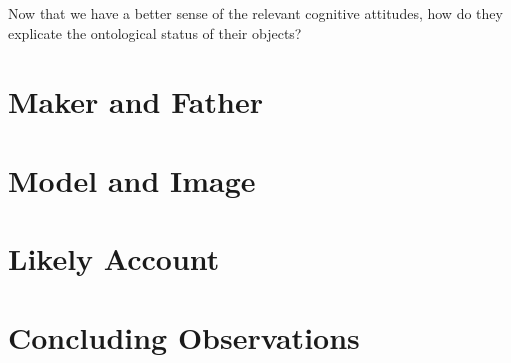 Now that we have a better sense of the relevant cognitive attitudes, how do they explicate the ontological status of their objects?


\section{Maker and Father} %
\label{sec:maker_and_father}




\section{Model and Image} %
\label{sec:model_and_image}




\section{Likely Account} %
\label{sec:likely_account}




\section{Concluding Observations} %
\label{sec:concluding_observations}




